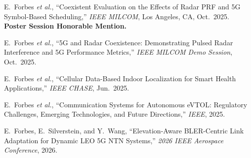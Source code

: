 \documentclass[9pt, letterpaper]{article}
\begin{document}
\begin{enumerate}[label={\footnotesize[\arabic*]}, leftmargin=2em, itemsep=0pt, topsep=0pt]
  \item {\footnotesize E.~Forbes \textit{et al.}, ``Coexistent Evaluation on the Effects of Radar PRF and 5G Symbol-Based Scheduling,''
        \textit{IEEE MILCOM}, Los Angeles, CA, Oct.\ 2025. \textbf{Poster Session Honorable Mention.}}

  \item {\footnotesize E.~Forbes \textit{et al.}, ``5G and Radar Coexistence: Demonstrating Pulsed Radar Interference and 5G Performance Metrics,''
        \textit{IEEE MILCOM Demo Session}, Oct.\ 2025.}

  \item {\footnotesize E.~Forbes \textit{et al.}, ``Cellular Data-Based Indoor Localization for Smart Health Applications,''
        \textit{IEEE CHASE}, Jun.\ 2025.}

  \item {\footnotesize E.~Forbes \textit{et al.}, ``Communication Systems for Autonomous eVTOL: Regulatory Challenges, Emerging Technologies, and Future Directions,''
        \textit{IEEE}, 2025.}

  \item {\footnotesize E.~Forbes, E.~Silverstein, and Y.~Wang, ``Elevation-Aware BLER-Centric Link Adaptation for Dynamic LEO 5G NTN Systems,''
        \textit{2026 IEEE Aerospace Conference}, 2026.}
\end{enumerate}
\end{document}
